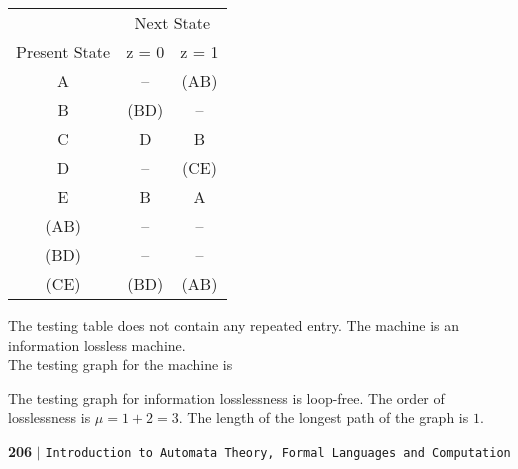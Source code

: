 \documentclass{article}
\begin{document}
\begin{center}
  \begin{tabular}{ccc}
\hline

\hline

\hline

\hline
 & \multicolumn{2}{c}{Next State}\\
 \cline{2-3}
Present State & z = 0 & z = 1\\
\hline
 A &     --    &    (AB)    \\
 B &    (BD)   &     --     \\
 C &     D     &     B      \\
 D &     --    &    (CE)    \\
 E &     B     &     A      \\
\hline
(AB) &    --      &     --  \\
(BD) &    --      &     --  \\
(CE) &   (BD)     &    (AB) \\
\hline

\hline

\hline

\hline

  \end{tabular}
\end{center}

\hspace*{0.1cm} The testing table does not contain any repeated entry. The machine is an information lossless machine.\\
\hspace*{0.1cm} The testing graph for the machine is


\begin{center}
\end{center}

\hspace*{0.1cm} The testing graph for information losslessness is loop-free. The order of losslessness is $\mu = 1 + 2 = 3$. The length of the longest path of the graph is $1$.

\newpage
\begin{flushleft}
    \textbf{206}\hspace*{0.1cm} \textbf{$|$} \hspace*{0.1cm} {\small \texttt{Introduction to Automata Theory, Formal Languages and Computation}}
  \end{flushleft}
\vspace*{0.5cm}
\end{document}
